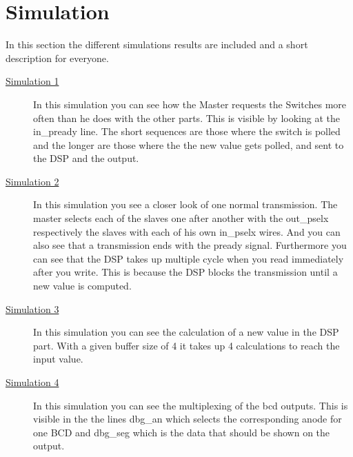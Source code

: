 \documentclass[%
	a4paper,
]
{article}
\begin{document}
\section{Simulation}
In this section the different simulations results are included and a short description for
everyone.

\begin{description}


\item[\hyperlink{sim1.1}{Simulation 1}] In this simulation you can see how the Master requests the Switches more often than he does
with the other parts. This is visible by looking at the in\_pready line. The short sequences are
those where the switch is polled and the longer are those where the the new value gets polled,
and sent to the DSP and the output.

\item[\hyperlink{sim2.1}{Simulation 2}] In this simulation you see a closer look of one normal transmission. The master
selects each of the slaves one after another with the out\_pselx respectively the slaves with each 
of his own in\_pselx wires. And you can also see that a transmission ends with the pready signal. 
Furthermore you can see that the DSP takes up multiple cycle when you read immediately after you
write. This is because the DSP blocks the transmission until a new value is computed.

\item[\hyperlink{sim3.1}{Simulation 3}] In this simulation you can see the calculation of a new value in the 
DSP part. With a given buffer size of 4 it takes up 4 calculations to reach the input value.

\item[\hyperlink{sim4.1}{Simulation 4}] In this simulation you can see the multiplexing of the bcd outputs. This
is visible in the the lines dbg\_an which selects the corresponding anode for one BCD and 
dbg\_seg which is the data that should be shown on the output.
\end{description}
\newpage






\end{document}
